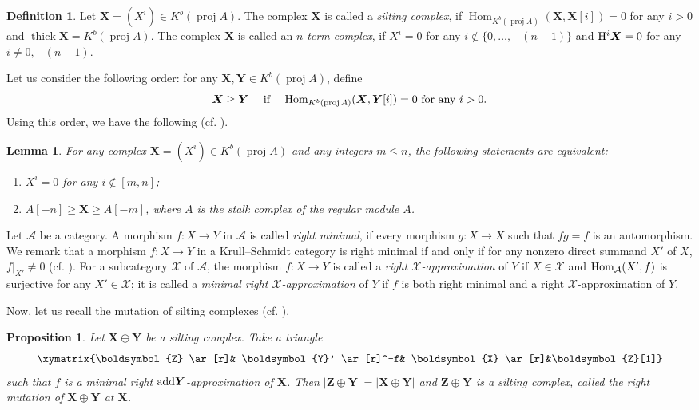 \documentclass[reqno,12pt]{amsart}
\numberwithin{equation}{section}
\theoremstyle{plain}
\newtheorem{lemma}[theorem]{\bf Lemma}
\newtheorem{proposition}[theorem]{\bf Proposition}
\theoremstyle{definition}
\newtheorem{definition}[theorem]{\bf Definition}
\begin{document}
\begin{definition}\label{silting}
Let \( \boldsymbol{X} = (X^i) \in K^b(\operatorname{proj} A) \).
The complex \( \boldsymbol{X} \) is called a {\em silting complex}, if
$\operatorname{Hom}_{K^b(\operatorname{proj} A)}(\boldsymbol{X}, \boldsymbol{X}[i]) = 0$ for any $i > 0$
and
$\operatorname{thick} \boldsymbol{X} = K^b(\operatorname{proj} A).$
The complex \( \boldsymbol{X} \) is called an {\em $n$-term complex}, if
$X^i = 0$ for any $i \notin \{0, \ldots, -(n-1)\}$
and ${\rm H}^{i} \boldsymbol{X} = 0$ for any $i \neq 0, -(n-1)$.
\end{definition}
Let us consider the following order: for any \( \boldsymbol{X}, \boldsymbol{Y} \in  K^b(\operatorname{proj} A) \), define
\begin{equation}\label{dydx}
 \boldsymbol{X} \geq \boldsymbol{Y}~~~~\text{if}~~~~
\mbox{\rm Hom}_{K^b(\operatorname{proj} A)}(\boldsymbol{X}, \boldsymbol{Y}[i]) = 0~\text{for~any}~ i > 0.\end{equation}
Using this order, we have the following (cf. \cite[Proposition 2.9]{MUC}).
\begin{lemma}\label{bjdx}
For any complex \( \boldsymbol{X} = (X^i) \in K^b(\operatorname{proj} A) \) and any integers $m\leq n$, the following statements are equivalent:
\begin{enumerate}
    \item[(1)] \( X^i = 0 \) for any \( i \notin [m, n] \);
    \item[(2)] \( A[-n] \geq \boldsymbol{X} \geq A[-m] \), where \( A \) is the stalk complex of the regular module \( A \).
\end{enumerate}
\end{lemma}

Let $\mathcal{A}$ be a category. A morphism $f:X \to Y$ in $\mathcal{A}$ is called {\em right minimal}, if every morphism $g:X\to X$ such that $fg=f$ is an automorphism.
We remark that a morphism $f:X \to Y$ in a Krull--Schmidt category is right minimal if and only if for any nonzero direct summand \( X' \) of \( X \), \( f|_{X'} \neq 0 \) (cf. \cite{BIA}). For a subcategory $\mathcal{X}$ of $\mathcal{A}$, the morphism $f:X \to Y$ is called a {\em right $\mathcal{X}$-approximation} of $Y$ if $X\in\mathcal{X}$ and $\mbox{\rm Hom}_{\mathcal{A}}(X',f)$ is surjective for any $X'\in \mathcal{X}$; it is called a {\em minimal right $\mathcal{X}$-approximation} of $Y$ if $f$ is both right minimal and a right $\mathcal{X}$-approximation of $Y$.

Now, let us recall the mutation of silting complexes (cf. \cite{AIHA,SOT}).
\begin{proposition}\label{mutation}
Let $\boldsymbol{X} \oplus \boldsymbol{Y}$ be a silting complex. Take a triangle
\[
\xymatrix{\boldsymbol{Z} \ar[r]& \boldsymbol{Y}' \ar[r]^-f& \boldsymbol{X} \ar[r]&\boldsymbol{Z}[1]}
\]
such that $f$ is a minimal right ${\rm add}\boldsymbol{Y}$-approximation of $\boldsymbol{X}$. Then $|\boldsymbol{Z} \oplus \boldsymbol{Y}|=|\boldsymbol{X} \oplus \boldsymbol{Y}|$ and $\boldsymbol{Z} \oplus \boldsymbol{Y}$ is a silting complex, called the {right mutation} of $\boldsymbol{X} \oplus \boldsymbol{Y} $ at $\boldsymbol{X}$.
\end{proposition}
\end{document}
